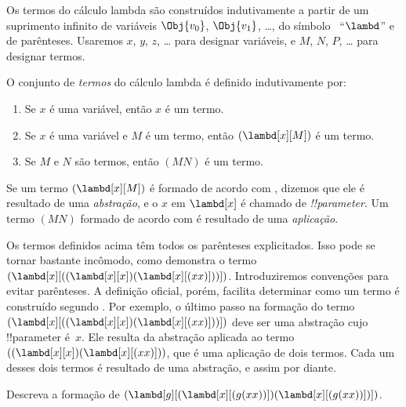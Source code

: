 \documentclass[../../../include/open-logic-section]{subfiles}
\begin{document}

Os termos do cálculo lambda são construídos indutivamente a partir de um
suprimento infinito de variáveis $\Obj{v_0}$, $\Obj{v_1}$, \dots, do símbolo
~``$\lambd$'' e de parênteses. Usaremos $x$, $y$, $z$, \dots{} para
designar variáveis, e $M$, $N$, $P$, \dots{} para designar termos.

\begin{defn}[Termos] 
O conjunto de \emph{termos} do cálculo lambda é definido indutivamente por:
\begin{enumerate}
  \item {} Se $x$ é uma variável, então $x$ é um
    termo.
  \item {} Se $x$ é uma variável e $M$ é um
    termo, então $(\lambd[x][M])$ é um termo.
  \item {} Se $M$ e $N$ são termos, então
    $(MN)$ é um termo.
\end{enumerate}
\end{defn}

Se um termo $(\lambd[x][M])$ é formado de acordo com
, dizemos que ele é resultado de uma
\emph{abstração}, e o $x$ em $\lambd[x]$ é chamado de
\emph{!!{parameter}}. Um termo $(MN)$ formado de acordo com
 é resultado de uma \emph{aplicação}.

Os termos definidos acima têm todos os parênteses explicitados. Isso pode se
tornar bastante incômodo, como demonstra o termo
$(\lambd[x][((\lambd[x][x])(\lambd[x][(xx)]))])$. Introduziremos convenções
para evitar parênteses. A definição oficial, porém, facilita determinar como
um termo é construído segundo . Por exemplo, o último passo
na formação do termo
$(\lambd[x][((\lambd[x][x])(\lambd[x][(xx)]))])$ deve ser uma abstração
cujo !!{parameter} é~$x$. Ele resulta da abstração aplicada ao termo
$((\lambd[x][x])(\lambd[x][(xx)]))$, que é uma aplicação de dois termos.
Cada um desses dois termos é resultado de uma abstração, e assim por diante.

\begin{prob}
Descreva a formação de $(\lambd[g][(\lambd[x][(g (x x))])
  (\lambd[x][(g (x x))])])$.
\end{prob}
\end{document}
